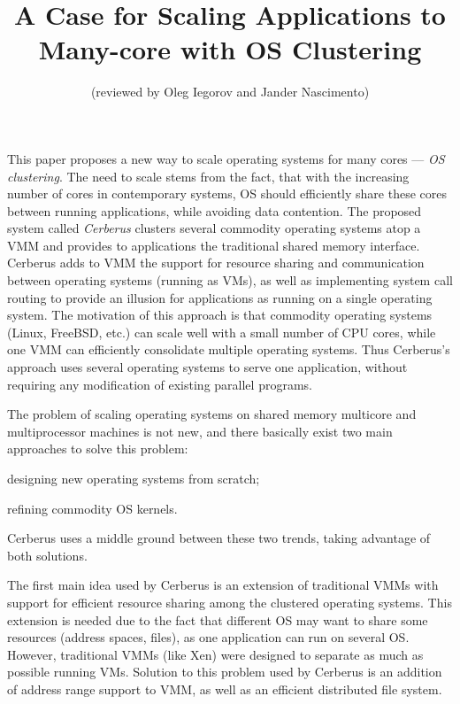 \documentclass[journal]{IEEEtran}
\begin{document}
%
\title{A Case for Scaling Applications to Many-core with OS Clustering}
\author{
(reviewed by Oleg Iegorov and Jander Nascimento)}
\maketitle

This paper proposes a new way to scale operating systems for many cores
--- \emph{OS clustering}. 
The need to scale
stems from the fact, that with the increasing number of cores in
contemporary systems, OS should
efficiently share these cores between running applications, while avoiding data contention. 
The proposed
system called \emph{Cerberus} clusters several commodity operating systems atop
a VMM and provides to applications the traditional shared memory
interface.  Cerberus adds to VMM the support for resource sharing and
communication between operating systems (running as VMs), as well as implementing system
call routing to provide an illusion for applications as running on a
single operating system.  The motivation of this approach is that
commodity operating systems (Linux, FreeBSD, etc.) can scale well with a
small number of CPU cores, while one VMM can efficiently consolidate
multiple operating systems. Thus Cerberus's approach uses several
operating systems to serve one application, without requiring any
modification of existing parallel programs.

The problem of scaling operating systems on shared memory multicore and
multiprocessor machines is not new, and there basically exist two main
approaches to solve this problem:

\begin{enumerate*}
  \item designing new operating systems from scratch;
  \item refining commodity OS kernels.
\end{enumerate*}

Cerberus uses a middle ground between these two trends, taking advantage
of both solutions.

The first main idea used by Cerberus is an extension of traditional VMMs
with support for efficient resource sharing among the clustered
operating systems. This extension is needed due to the fact that
different OS may want to share some resources (address spaces, files), as
one application can run on several OS. However, traditional VMMs (like
Xen) were designed to separate as much as possible running VMs. Solution
to this problem used by Cerberus is an addition of address range support
to VMM, as well as an efficient distributed file system.
\end{document}
